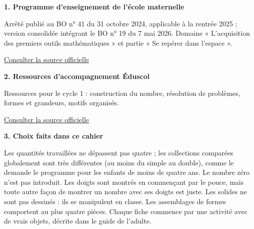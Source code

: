 \clearpage\pagestyle{matSimple}\label{sources}
{\fontsize{9.5}{13.5}\selectfont \textbf{1. Programme d’enseignement de l’école maternelle}\par Arrêté publié au BO n° 41 du 31 octobre 2024, applicable à la rentrée 2025 ; version consolidée intégrant le BO n° 19 du 7 mai 2026. Domaine « L’acquisition des premiers outils mathématiques » et partie « Se repérer dans l’espace ».\par\href{https://eduscol.education.gouv.fr/sites/default/files/document/programme-cycle-1-consolide-127565.pdf}{\textcolor{otGreenDark}{Consulter la source officielle}}\par\medskip
\textbf{2. Ressources d’accompagnement Éduscol}\par Ressources pour le cycle 1 : construction du nombre, résolution de problèmes, formes et grandeurs, motifs organisés.\par\href{https://eduscol.education.gouv.fr/}{\textcolor{otGreenDark}{Consulter la source officielle}}\par\medskip
\textbf{3. Choix faits dans ce cahier}\par Les quantités travaillées ne dépassent pas quatre ; les collections comparées globalement sont très différentes (au moins du simple au double), comme le demande le programme pour les enfants de moins de quatre ans. Le nombre zéro n’est pas introduit. Les doigts sont montrés en commençant par le pouce, mais toute autre façon de montrer un nombre avec ses doigts est juste. Les solides ne sont pas dessinés : ils se manipulent en classe. Les assemblages de formes comportent au plus quatre pièces. Chaque fiche commence par une activité avec de vrais objets, décrite dans le guide de l’adulte.\par}
